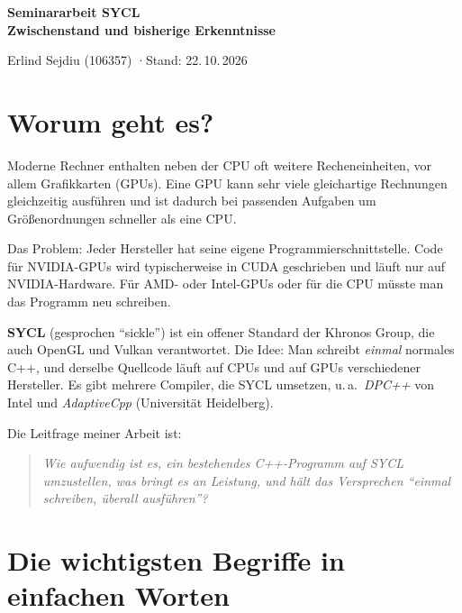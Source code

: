 \documentclass[11pt]{article}
\begin{document}
\begin{center}
    {\LARGE\bfseries Seminararbeit SYCL\\[0.3em]
    Zwischenstand und bisherige Erkenntnisse\par}
    \vspace{0.8em}
    Erlind Sejdiu (106357) \quad·\quad Stand: 22.\,10.\,2026
\end{center}

\tableofcontents

\section{Worum geht es?}

Moderne Rechner enthalten neben der CPU oft weitere Recheneinheiten,
vor allem Grafikkarten (GPUs). Eine GPU kann sehr viele gleichartige
Rechnungen gleichzeitig ausführen und ist dadurch bei passenden Aufgaben um
Größenordnungen schneller als eine CPU.

Das Problem: Jeder Hersteller hat seine eigene Programmierschnittstelle.
Code für NVIDIA-GPUs wird typischerweise in CUDA geschrieben und läuft nur
auf NVIDIA-Hardware. Für AMD- oder Intel-GPUs oder für die CPU müsste man
das Programm neu schreiben.

\textbf{SYCL} (gesprochen \enquote{sickle}) ist ein offener Standard der
Khronos Group, die auch OpenGL und Vulkan verantwortet. Die Idee: Man
schreibt \emph{einmal} normales C++, und derselbe Quellcode läuft auf
CPUs und auf GPUs verschiedener Hersteller. Es gibt mehrere Compiler, die
SYCL umsetzen, u.\,a.\ \emph{DPC++} von Intel und \emph{AdaptiveCpp}
(Universität Heidelberg).

Die Leitfrage meiner Arbeit ist:
\begin{quote}
\emph{Wie aufwendig ist es, ein bestehendes C++-Programm auf SYCL
umzustellen, was bringt es an Leistung, und hält das Versprechen
\enquote{einmal schreiben, überall ausführen}?}
\end{quote}

\section{Die wichtigsten Begriffe in einfachen Worten}
\end{document}
